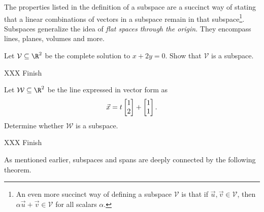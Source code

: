 	The properties listed in the definition of a subspace are a succinct
	way of stating that a linear combinations of vectors in a subspace
	remain in that subspace\footnote{ An even more succinct
	way of defining a subspace $\mathcal V$ is that if $\vec u,\vec v\in\mathcal V$,
	then $\alpha\vec u+\vec v\in\mathcal V$ for all scalars $\alpha$.}.
	Subspaces generalize the idea of \emph{flat spaces through the origin}. They encompass
	lines, planes, volumes and more.

	\begin{example}
		Let $\mathcal V\subseteq \R^2$ be the complete solution to 
		$x+2y=0$.  Show that $\mathcal V$ is a subspace.

		XXX Finish
	\end{example}

	\begin{example}
		Let $\mathcal W\subseteq \R^2$ be the line expressed in vector form
		as 
		\[
			\vec x=t\mat{1\\2}+\mat{1\\1}.
		\]
		Determine whether $\mathcal W$ is a subspace.

		XXX Finish
	\end{example}


	As mentioned earlier, subspaces and spans are deeply connected
	by the following theorem.

